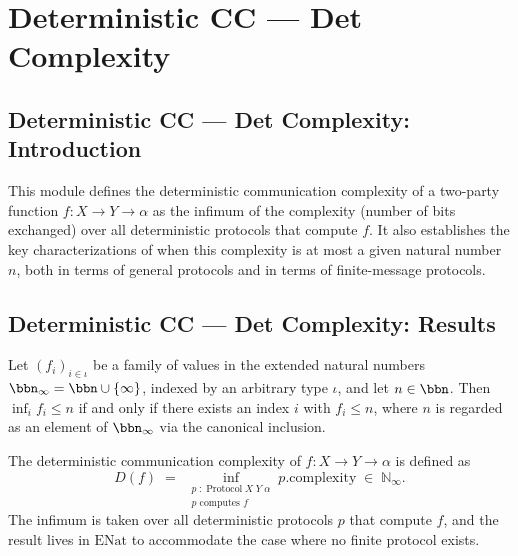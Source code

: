 \section{Deterministic CC --- Det Complexity}
\subsection*{Deterministic CC --- Det Complexity: Introduction}

This module defines the deterministic communication complexity of a two-party function
$f : X \to Y \to \alpha$ as the infimum of the complexity (number of bits exchanged) over
all deterministic protocols that compute $f$.  It also establishes the key
characterizations of when this complexity is at most a given natural number $n$, both
in terms of general protocols and in terms of finite-message protocols.

\subsection*{Deterministic CC --- Det Complexity: Results}

\begin{theorem}
\label{CommunicationComplexity.Internal.enat_iInf_le_coe_iff}
\leanok
{}
Let $(f_i)_{i \in \iota}$ be a family of values in the extended natural numbers
$\bbn_\infty = \bbn \cup \{\infty\}$, indexed by an arbitrary type $\iota$, and let $n
\in \bbn$. Then $\inf_{i} f_i \le n$ if and only if there exists an index $i$ with $f_i
\le n$, where $n$ is regarded as an element of $\bbn_\infty$ via the canonical
inclusion.
\end{theorem}

\begin{definition}
\label{CommunicationComplexity.Deterministic.communicationComplexity}
\leanok
{}
The deterministic communication complexity of $f : X \to Y \to \alpha$ is defined as
\[
  D(f) \;=\; \inf_{\substack{p \;:\; \mathrm{Protocol}\;X\;Y\;\alpha \\ p \text{ computes } f}}
              p.\mathrm{complexity} \;\in\; \mathbb{N}_\infty.
\]
The infimum is taken over all deterministic protocols $p$ that compute $f$, and the
result lives in $\mathrm{ENat}$ to accommodate the case where no finite protocol exists.
\end{definition}

